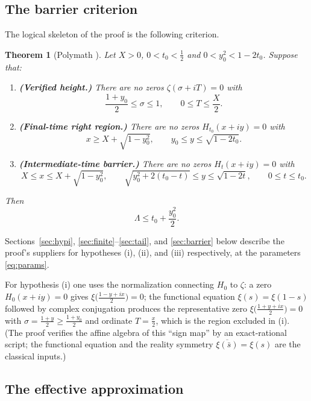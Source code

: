 \documentclass[11pt]{article}
\newtheorem{theorem}{Theorem}[section]
\theoremstyle{definition}
\newcommand{\LB}{\Lambda}
\begin{document}
\subsection{The barrier criterion}

The logical skeleton of the proof is the following criterion.

\begin{theorem}[{Polymath \cite[Theorem~1.2]{Polymath}}]\label{thm:criterion}
Let $X>0$, $0<t_0<\tfrac12$ and $0<y_0^2<1-2t_0$. Suppose that:
\begin{enumerate}
\item[\textup{(i)}] \textbf{(Verified height.)} There are no zeros
$\zeta(\sigma+iT)=0$ with
\[
\frac{1+y_0}{2}\le\sigma\le1,\qquad 0\le T\le\frac X2 .
\]
\item[\textup{(ii)}] \textbf{(Final-time right region.)} There are no
zeros $H_{t_0}(x+iy)=0$ with
\[
x\ge X+\sqrt{1-y_0^2},\qquad y_0\le y\le\sqrt{1-2t_0}.
\]
\item[\textup{(iii)}] \textbf{(Intermediate-time barrier.)} There are
no zeros $H_t(x+iy)=0$ with
\[
X\le x\le X+\sqrt{1-y_0^2},\qquad
\sqrt{y_0^2+2(t_0-t)}\le y\le\sqrt{1-2t},\qquad
0\le t\le t_0 .
\]
\end{enumerate}
Then
\[
\LB\le t_0+\frac{y_0^2}{2}.
\]
\end{theorem}

Sections~\ref{sec:hypi}, \ref{sec:finite}--\ref{sec:tail}, and
\ref{sec:barrier} below describe the proof's suppliers for
hypotheses (i), (ii), and (iii) respectively, at the parameters
\eqref{eq:params}.

For hypothesis (i) one uses the normalization connecting $H_0$ to
$\zeta$: a zero $H_0(x+iy)=0$ gives
$\xi\bigl(\frac{1-y+ix}{2}\bigr)=0$; the functional equation
$\xi(s)=\xi(1-s)$ followed by complex conjugation produces the
representative zero $\xi\bigl(\frac{1+y+ix}{2}\bigr)=0$ with
$\sigma=\frac{1+y}2\ge\frac{1+y_0}2$ and ordinate $T=\frac x2$, which
is the region excluded in (i). (The proof verifies the affine
algebra of this ``sign map'' by an exact-rational script; the
functional equation and the reality symmetry
$\overline{\xi(\bar s)}=\xi(s)$ are the classical inputs.)

\subsection{The effective approximation}\label{sec:thm13}
\end{document}
